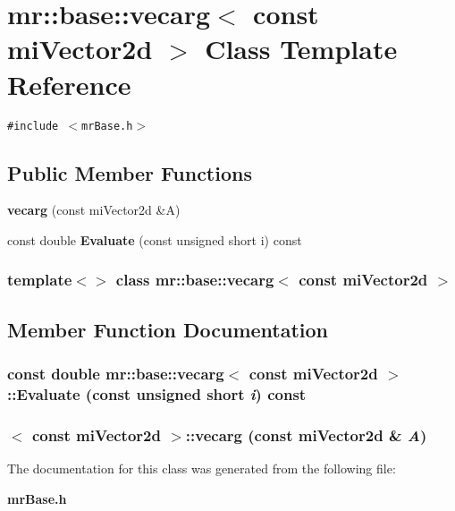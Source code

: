 \section{mr::base::vecarg$<$ const mi\-Vector2d $>$ Class Template Reference}
\label{classmr_1_1base_1_1vecarg_3_01const_01miVector2d_01_4}
{\tt \#include $<$mr\-Base.h$>$}

\subsection*{Public Member Functions}
\begin{CompactItemize}
\item 
{\bf vecarg} (const mi\-Vector2d \&A)
\item 
const double {\bf Evaluate} (const unsigned short i) const 
\end{CompactItemize}
\subsubsection*{template$<$$>$ class mr::base::vecarg$<$ const mi\-Vector2d $>$}



\subsection{Member Function Documentation}
\subsubsection{\setlength{\rightskip}{0pt plus 5cm}const double {\bf mr::base::vecarg}$<$ const mi\-Vector2d $>$::Evaluate (const unsigned short {\em i}) const\hspace{0.3cm}{\tt  [inline]}}\label{classmr_1_1base_1_1vecarg_3_01const_01miVector2d_01_4_a1}


\subsubsection{$<$ const mi\-Vector2d $>$::{\bf vecarg} (const mi\-Vector2d \& {\em A})\hspace{0.3cm}{\tt  [inline]}}\label{classmr_1_1base_1_1vecarg_3_01const_01miVector2d_01_4_a0}




The documentation for this class was generated from the following file:\begin{CompactItemize}
\item 
{\bf mr\-Base.h}\end{CompactItemize}
